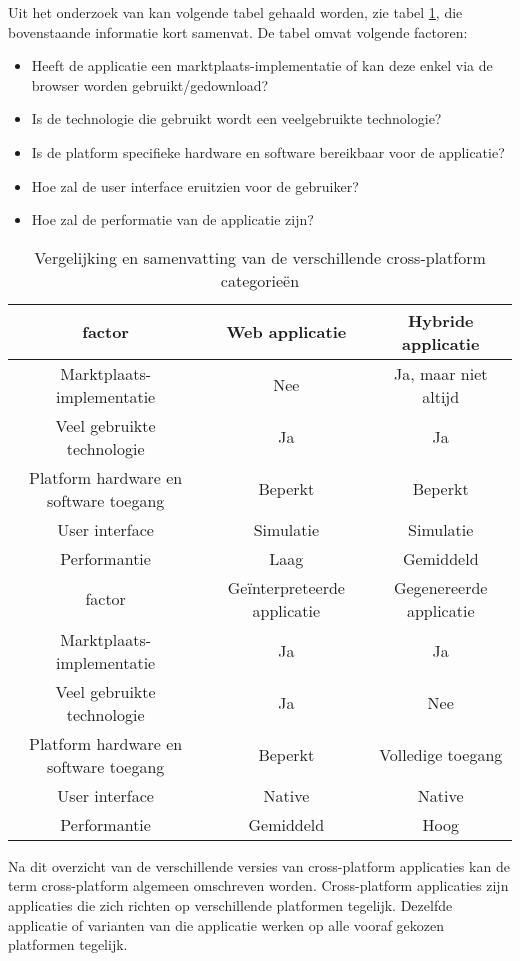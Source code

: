 Uit het onderzoek van \textcite{Xanthopoulos2013} kan volgende tabel gehaald worden, zie tabel  \ref{tab:svzCP},  die bovenstaande informatie kort samenvat. De tabel omvat volgende factoren:
\begin{itemize}
    \item Heeft de applicatie een marktplaats-implementatie of kan deze enkel via de browser worden gebruikt/gedownload?
    \item Is de technologie die gebruikt wordt een veelgebruikte technologie?
    \item Is de platform specifieke hardware en software bereikbaar voor de applicatie?
    \item Hoe zal de user interface eruitzien voor de gebruiker?
    \item Hoe zal de performatie van de applicatie zijn?
\end{itemize}

\begin{table}[h!]
    \caption{Vergelijking en samenvatting van de verschillende cross-platform categorieën}
    \begin{tabular}{ |c||c|c| }
        \hline
        factor&Web applicatie&Hybride applicatie\\
        \hline
        Marktplaats-implementatie&Nee&Ja, maar niet altijd\\
        Veel gebruikte technologie&Ja&Ja\\
        Platform hardware en software toegang&Beperkt&Beperkt\\
        User interface&Simulatie&Simulatie\\
        Performantie&Laag&Gemiddeld\\
        \hline
        \hline
        factor&Geïnterpreteerde applicatie&Gegenereerde applicatie\\
        \hline
        Marktplaats-implementatie&Ja&Ja\\
        Veel gebruikte technologie&Ja&Nee\\
        Platform hardware en software toegang&Beperkt&Volledige toegang\\
        User interface&Native&Native\\
        Performantie&Gemiddeld&Hoog\\
        \hline
    \end{tabular}
    \label{tab:svzCP}
\end{table}

Na dit overzicht van de verschillende versies van cross-platform applicaties kan de term cross-platform algemeen omschreven worden. Cross-platform applicaties zijn applicaties die zich richten op verschillende platformen tegelijk. Dezelfde applicatie of varianten van die applicatie werken op alle vooraf gekozen platformen tegelijk. 

